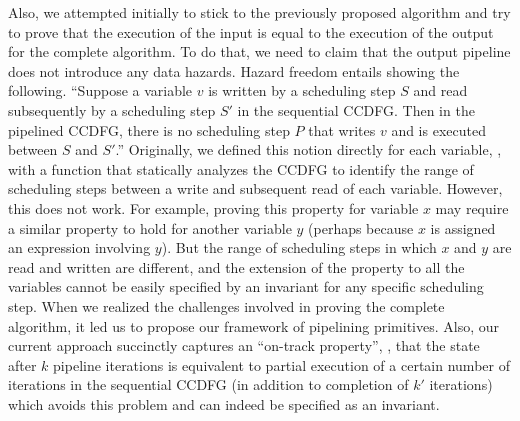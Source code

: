 Also, we attempted initially to stick to the previously proposed algorithm
and try to prove that the execution of the input is equal to the execution
of the output for the complete algorithm. To do that, we need to claim that
the output pipeline does not introduce any data hazards.
Hazard freedom entails showing the
following. ``Suppose a variable $v$ is written by a
scheduling step $S$ and read subsequently by a scheduling
step $S'$ in the sequential CCDFG.  Then in the pipelined
CCDFG, there is no scheduling step $P$ that writes $v$ and
is executed between $S$ and $S'$.''  Originally, we defined
this notion directly for each variable, \viz, with a
function that statically analyzes the CCDFG to identify the
range of scheduling steps between a write and subsequent
read of each variable.  However, this does not
work.  For example, proving this property for variable $x$
may require a similar property to hold for another variable
$y$ (perhaps because $x$ is assigned an expression involving
$y$).  But the range of scheduling steps in which $x$ and
$y$ are read and written are different, and the extension of
the property to all the variables cannot be easily specified
by an invariant for any specific scheduling step. When we realized
the challenges involved in proving the complete algorithm,
it led us to propose our framework of pipelining primitives.
Also, our current approach succinctly captures an ``on-track property'',
\viz, that the
state after $k$ pipeline iterations is equivalent to partial
execution of a certain number of iterations in the
sequential CCDFG (in addition to completion of $k'$
iterations) which avoids this problem and can indeed be
specified as an invariant.

